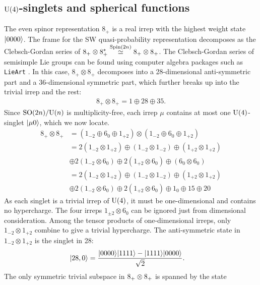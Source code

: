 \subsection{$\text{U}(4)$-singlets and spherical functions}

The even spinor representation $8_+$ is a real irrep with the highest weight state ${\left\vert{0000}\right\rangle}$. The frame for the SW quasi-probability representation decomposes as the Clebsch-Gordan series of $8_+ \otimes 8_+^* \stackrel{\text{Spin}(2n)}{\simeq} 8_+ \otimes 8_+$. The Clebsch-Gordan series of semisimple Lie groups can be found using computer algebra packages such as \texttt{LieArt} \cite{lieart}. In this case, $8_+ \otimes 8_+$ decomposes into a 28-dimensional anti-symmetric part and a 36-dimensional symmetric part, which further breaks up into the trivial irrep and the rest:
\begin{align}
8_+ \otimes 8_+ = 1 \oplus 28 \oplus 35.
\end{align}
Since $\text{SO}(2n)/\text{U}(n)$ is multiplicity-free, each irrep $\mu$ contains at most one $\text{U}(4)$-singlet ${\left\vert{\mu 0}\right\rangle}$, which we now locate.
\begin{align}
8_+ \otimes 8_+ &= (1_{-2} \oplus 6_0 \oplus 1_{+2}) \otimes (1_{-2} \oplus 6_0 \oplus 1_{+2}) \nonumber \\
&= 2(1_{-2} \otimes 1_{+2}) \oplus (1_{-2} \otimes 1_{-2}) \oplus (1_{+2} \otimes 1_{+2}) \nonumber \\
&\oplus 2(1_{-2} \otimes 6_0) \oplus 2( 1_{+2} \otimes 6_0) \oplus (6_0 \otimes 6_0) \\
&= 2(1_{-2} \otimes 1_{+2}) \oplus (1_{-2} \otimes 1_{-2}) \oplus (1_{+2} \otimes 1_{+2}) \nonumber \\
&\oplus 2(1_{-2} \otimes 6_0) \oplus 2(1_{+2} \otimes 6_0) \oplus 1_0 \oplus 15 \oplus 20
\end{align}
As each singlet is a trivial irrep of $\text{U}(4)$, it must be one-dimensional and contains no hypercharge. The four irreps $1_{\pm2} \otimes 6_0$ can be ignored just from dimensional consideration. Among the tensor products of one-dimensional irreps, only $1_{-2} \otimes 1_{+2}$ combine to give a trivial hypercharge. The anti-symmetric state in $1_{-2} \otimes 1_{+2}$ is the singlet in 28:
\begin{align}
{\left\vert{\text 28,0}\right\rangle} &= \frac{{\left\vert{0000}\right\rangle} {\left\vert{1111}\right\rangle} - {\left\vert{1111}\right\rangle} {\left\vert{0000}\right\rangle} }{\sqrt{2}}.
\end{align}
The only symmetric trivial subspace in ${\text 8_+ \otimes 8_+}$ is spanned by the state
